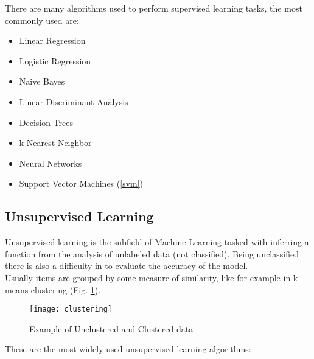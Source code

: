 There are many algorithms used to perform supervised learning tasks, the most commonly used are: \\
\begin{itemize}[noitemsep, topsep = -5pt]
	\item Linear Regression
	\item Logistic Regression
	\item Naive Bayes
	\item Linear Discriminant Analysis
	\item Decision Trees
	\item k-Nearest Neighbor
	\item Neural Networks
	\item Support Vector Machines (\ref{svm})
\end{itemize}


\subsection{Unsupervised Learning} \label{unsupervised}
Unsupervised learning is the subfield of Machine Learning tasked with inferring a function from the analysis of unlabeled data (not classified). Being unclassified there is also a difficulty in to evaluate the accuracy of the model.\\
Usually items are grouped by some measure of similarity, like for example in k-means clustering (Fig. \ref{fig:clustering}).

\begin{figure}[H]
	\centering
	\texttt{[image: clustering]}
	\caption{Example of Unclustered and Clustered data \cite{kmeans}}
	\label{fig:clustering}
\end{figure}	

These are the most widely used unsupervised learning algorithms:


